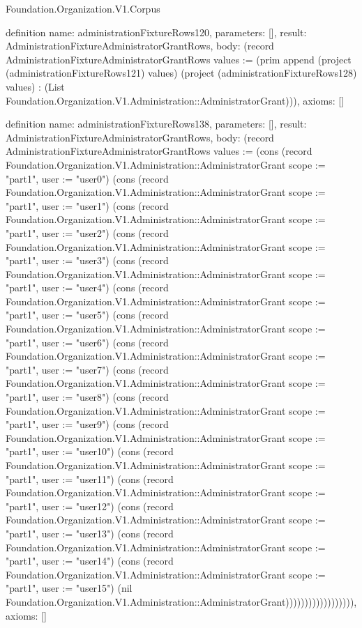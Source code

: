 \begin{lexlean}{Foundation.Organization.V1.Corpus}
\begin{semanticmodule}
definition{
  name: administrationFixtureRows120,
  parameters: [],
  result: AdministrationFixtureAdministratorGrantRows,
  body: (record AdministrationFixtureAdministratorGrantRows {values := (prim append (project (administrationFixtureRows121) values) (project (administrationFixtureRows128) values) : (List Foundation.Organization.V1.Administration::AdministratorGrant))}),
  axioms: []
}

definition{
  name: administrationFixtureRows138,
  parameters: [],
  result: AdministrationFixtureAdministratorGrantRows,
  body: (record AdministrationFixtureAdministratorGrantRows {values := (cons (record Foundation.Organization.V1.Administration::AdministratorGrant {scope := "part1", user := "user0"}) (cons (record Foundation.Organization.V1.Administration::AdministratorGrant {scope := "part1", user := "user1"}) (cons (record Foundation.Organization.V1.Administration::AdministratorGrant {scope := "part1", user := "user2"}) (cons (record Foundation.Organization.V1.Administration::AdministratorGrant {scope := "part1", user := "user3"}) (cons (record Foundation.Organization.V1.Administration::AdministratorGrant {scope := "part1", user := "user4"}) (cons (record Foundation.Organization.V1.Administration::AdministratorGrant {scope := "part1", user := "user5"}) (cons (record Foundation.Organization.V1.Administration::AdministratorGrant {scope := "part1", user := "user6"}) (cons (record Foundation.Organization.V1.Administration::AdministratorGrant {scope := "part1", user := "user7"}) (cons (record Foundation.Organization.V1.Administration::AdministratorGrant {scope := "part1", user := "user8"}) (cons (record Foundation.Organization.V1.Administration::AdministratorGrant {scope := "part1", user := "user9"}) (cons (record Foundation.Organization.V1.Administration::AdministratorGrant {scope := "part1", user := "user10"}) (cons (record Foundation.Organization.V1.Administration::AdministratorGrant {scope := "part1", user := "user11"}) (cons (record Foundation.Organization.V1.Administration::AdministratorGrant {scope := "part1", user := "user12"}) (cons (record Foundation.Organization.V1.Administration::AdministratorGrant {scope := "part1", user := "user13"}) (cons (record Foundation.Organization.V1.Administration::AdministratorGrant {scope := "part1", user := "user14"}) (cons (record Foundation.Organization.V1.Administration::AdministratorGrant {scope := "part1", user := "user15"}) (nil Foundation.Organization.V1.Administration::AdministratorGrant)))))))))))))))))}),
  axioms: []
}


\end{semanticmodule}
\end{lexlean}
